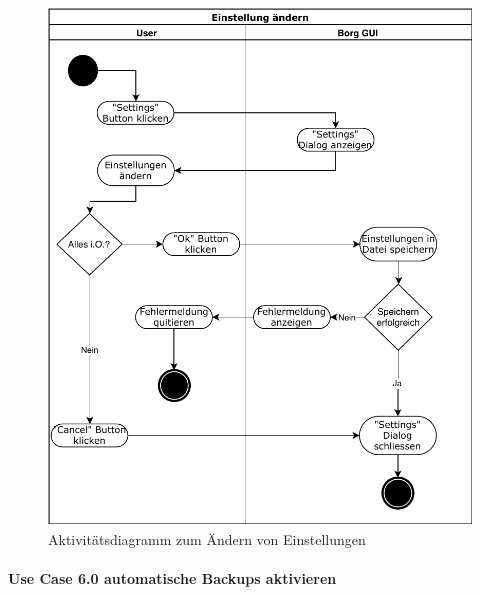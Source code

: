 \begin{figure}[htbp]
\centering
\includegraphics[width=.9\linewidth]{pictures/activity_settings.pdf}
\caption{\label{fig:orgec8a55e}
Aktivitätsdiagramm zum Ändern von Einstellungen}
\end{figure}
\newpage
\paragraph{Use Case 6.0 automatische Backups aktivieren}
\label{sec:orgf4aa53a}

